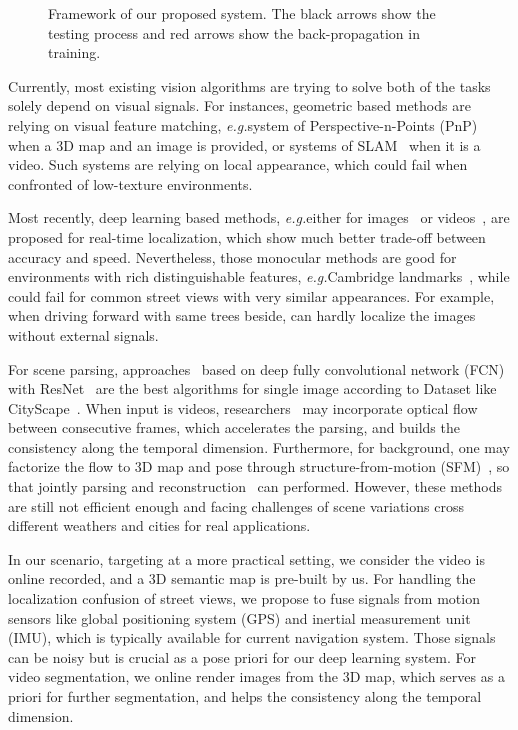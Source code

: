 \documentclass[10pt,twocolumn,letterpaper]{article}
\def\eg{\emph{e.g.}}
\begin{document}
\begin{figure*}[t]
\fbox{\rule{0pt}{2in} \rule{.9\linewidth}{0pt}}
   \caption{Framework of our proposed system. The black arrows show the testing process and red arrows show the back-propagation in training.}
\label{fig:framework}
\end{figure*}

Currently, most existing vision algorithms are trying to solve both of the tasks solely depend on visual signals. 
For instances, geometric based methods are relying on visual feature matching, \eg system of Perspective-n-Points (PnP)~\cite{haralick1994review,kneip2014upnp,campbell2017globally} when a 3D map and an image is provided, or systems of SLAM~\cite{engel2014lsd,mur2015orb,NewcombeLD11} when it is a video. Such systems are relying on local appearance, which could fail when confronted of low-texture environments.
 
Most recently, deep learning based methods, \eg either for images~\cite{Kendall_2015_ICCV} or videos~\cite{DBLP:journals/corr/ClarkWMTW17}, are proposed for real-time localization, which show much better trade-off between accuracy and speed.
Nevertheless, those monocular methods are good for environments with rich distinguishable features, \eg Cambridge landmarks~\cite{Kendall_2015_ICCV}, while could fail for common street views with very similar appearances. For example, when driving forward with same trees beside, can hardly localize the images without external signals.

For scene parsing, approaches~\cite{ZhaoSQWJ16,ChenPSA17} based on deep fully convolutional network (FCN) with ResNet~\cite{HeZRS15} are the best algorithms for single image according to Dataset like CityScape~\cite{Cordts2016Cityscapes}. When input is videos, researchers~\cite{kundu2016feature,zhu2016deep} may incorporate optical flow between consecutive frames, which accelerates the parsing, and builds the consistency along the temporal dimension. Furthermore, for background, one may factorize the flow to 3D map and pose through structure-from-motion (SFM)~\cite{wu2011visualsfm}, so that jointly parsing and reconstruction~\cite{kundu2014joint} can performed. However, these methods are still not efficient enough and facing challenges of scene variations cross different weathers and cities for real applications.

In our scenario, targeting at a more practical setting, we consider the video is online recorded, and a 3D semantic map is pre-built by us. For handling the localization confusion of street views, we propose to fuse signals from motion sensors like global positioning system (GPS) and inertial measurement unit (IMU), which is typically available for current navigation system. Those signals can be noisy but is crucial as a pose priori for our deep learning system. 
For video segmentation, we online render images from the 3D map, which serves as a priori for further segmentation, and helps the consistency along the temporal dimension. 
\end{document}
